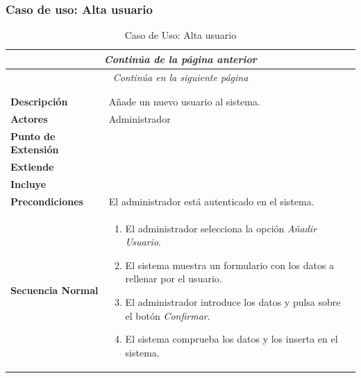 \newpage
\subsubsection*{Caso de uso: Alta usuario }
\begin{longtable}{| p{4cm} | p{10cm} |}
\endfirsthead
\multicolumn{2}{c}{\textit{Continúa de la página anterior}}\\[12pt]
\hline
\endhead
\hline
\multicolumn{2}{c}{\textit{Continúa en la siguiente página}} \\
\endfoot
\hline
\caption{Caso de Uso: Alta usuario}\label{fig:1}\\
\endlastfoot


\hline
\multicolumn{2}{|c|}{\textbf{CU$<$24$>$ - Alta Usuario}} \\

\hline
\textbf{Descripción} &
Añade un nuevo usuario al sistema.\\

\hline
\textbf{Actores} &
Administrador\\

\hline
\textbf{Punto de Extensión} &
\\

\hline
\textbf{Extiende} &
\\

\hline
\textbf{Incluye} &
\\

\hline
\textbf{Precondiciones} &
El administrador está autenticado en el sistema.\\

\hline
\textbf{Secuencia Normal} &\mbox{}\par\vspace{-\baselineskip}
\begin{enumerate}[leftmargin=0.7cm, topsep=0.1cm]
\item El administrador selecciona la opción \textit{Añadir Usuario}.
\item El sistema muestra un formulario con los datos a rellenar por el usuario.
\item El administrador introduce los datos y pulsa sobre el botón \textit{Confirmar}.
\item El sistema comprueba los datos y los inserta en el sistema.
\end{enumerate}



\end{longtable}
